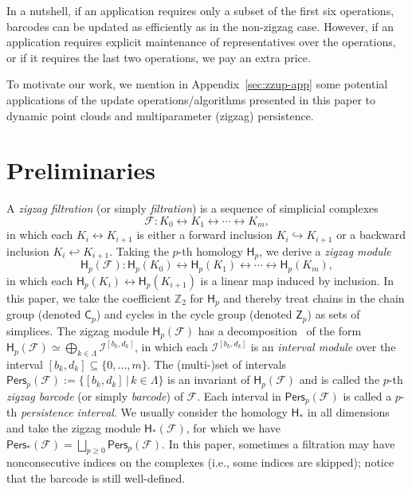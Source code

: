 \documentclass[letterpaper,11pt]{article}
\theoremstyle{mythmstyle}
\theoremstyle{mydefstyle}
\theoremstyle{plain}
\theoremstyle{definition}
\newcommand{\Hm}{\mathsf{H}}
\newcommand{\Chn}{\mathsf{C}}
\newcommand{\Cyc}{\mathsf{Z}}
\newcommand{\Pers}{\mathsf{Pers}}
\newcommand{\<}[1]{\langle #1\rangle}
\newcommand{\incto}{\hookrightarrow}
\newcommand{\bakincto}{\hookleftarrow}
\newcommand{\given}{\,|\,}
\newcommand{\Set}[1]{\{#1\}}
\newcommand{\Fcal}{\mathcal{F}}
\newcommand{\Ical}{\mathcal{I}}
\newcommand{\Zbb}{\mathbb{Z}}
\newcommand{\LG}{\Lambda}
\newcommand{\Dim}{p}
\newcommand{\birth}{b}
\newcommand{\death}{d}
\newcommand{\filtcnt}{m}
\begin{document}
In a nutshell, if an application requires only a subset of the first six operations,
barcodes can be updated
as efficiently as in the non-zigzag case. However,
if an application requires explicit maintenance of representatives over 
the operations, or if it requires the last two operations, we pay an extra price.






To motivate our work, we mention in Appendix~\ref{sec:zzup-app} some potential
applications of the update operations/algorithms presented in this paper
to dynamic point clouds and multiparameter (zigzag) persistence.

\section{Preliminaries}


A {\it zigzag filtration} (or simply {\it filtration})
is a sequence of simplicial complexes 
\begin{equation}
\label{eqn:prelim-filt}
\Fcal: K_0 \leftrightarrow K_1 \leftrightarrow 
\cdots \leftrightarrow K_\filtcnt,
\end{equation}
in which each
$K_i\leftrightarrow K_{i+1}$ is either a forward inclusion $K_i\incto K_{i+1}$
or a backward inclusion $K_i\bakincto K_{i+1}$.
Taking the $\Dim$-th homology $\Hm_\Dim$,
we derive a {\it zigzag module}
\[\Hm_\Dim(\Fcal): 
\Hm_\Dim(K_0) 
\leftrightarrow
\Hm_\Dim(K_1) 
\leftrightarrow
\cdots 
\leftrightarrow
\Hm_\Dim(K_\filtcnt), \]
in which
each $\Hm_\Dim(K_i)\leftrightarrow \Hm_\Dim(K_{i+1})$
is a linear map induced by inclusion.
In this paper, we take the coefficient $\Zbb_2$ for $\Hm_\Dim$
and thereby treat chains in the chain group (denoted $\Chn_\Dim$)
and cycles in the cycle group (denoted $\Cyc_\Dim$)
as sets of simplices.
The zigzag module $\Hm_\Dim(\Fcal)$
has a decomposition~\cite{carlsson2010zigzag,Gabriel72} of the form
$\Hm_\Dim(\Fcal)\simeq\bigoplus_{k\in\LG}\Ical^{[\birth_k,\death_k]}$,
in which each $\Ical^{[\birth_k,\death_k]}$
is an
{\it interval module} over the interval $[\birth_k,\death_k]\subseteq\Set{0,\ldots,\filtcnt}$.
The (multi-)set of intervals
$\Pers_\Dim(\Fcal):=\Set{[\birth_k,\death_k]\given k\in\LG}$
is an invariant of $\Hm_\Dim(\Fcal)$
and is called the $\Dim$-th {\it zigzag barcode} (or simply {\it barcode}) of $\Fcal$.
Each interval in $\Pers_\Dim(\Fcal)$
is called a $\Dim$-th \emph{persistence interval}.
We usually consider the homology $\Hm_*$ in all dimensions
and take the zigzag module $\Hm_*(\Fcal)$,
for which we have $\Pers_*(\Fcal)=\bigsqcup_{\Dim\geq 0}\Pers_\Dim(\Fcal)$.
In this paper,
sometimes a filtration may have nonconsecutive indices
on the complexes (i.e., some indices are skipped);
notice that the barcode is still well-defined.
\end{document}
